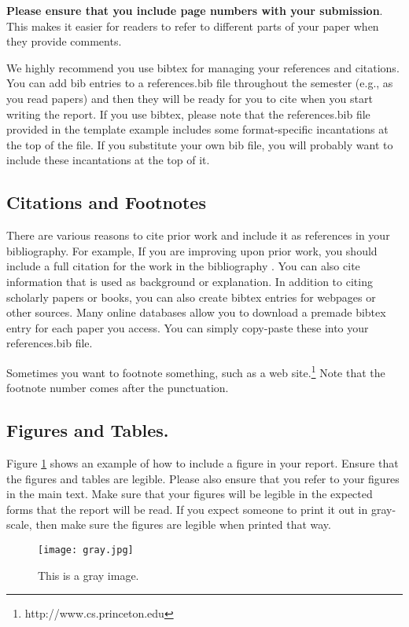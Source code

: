 \documentclass[pageno]{jpaper}
\begin{document}
\textbf{Please ensure that you include page numbers with your
submission}. This makes it easier for readers to refer to
different parts of your paper when they provide comments.

We highly recommend you use bibtex for managing your references and citations.  You can add bib entries to a references.bib file throughout the semester (e.g., as you read papers) and then they will be ready for you to cite when you start writing the report.  If you use bibtex, please note that the references.bib file provided in the template example includes some format-specific incantations at the top of the file.  If you substitute your own bib file, you will probably want to include these 
incantations at the top of it.

\subsection{Citations and Footnotes}

There are various reasons to cite prior work and include it as references in your bibliography.  For example, If you are improving upon 
prior work, you should include
a full citation for the work in the bibliography \cite{nicepaper,nicepaper2}. 
You can also cite information that is used as background or
explanation\cite{Salzberg:2005}.  In addition to citing scholarly papers or books, you can
also create bibtex entries for webpages or other sources.  Many online
databases allow you to download a premade bibtex entry for each paper
you access.  You can simply copy-paste these into your references.bib
file.

Sometimes you want to footnote something, such as a web
site.\footnote{http://www.cs.princeton.edu}  Note that the footnote
number comes after the punctuation.

\subsection{Figures and Tables.}

Figure \ref{fig:gray} shows an example of how to include a figure in
your report.  
Ensure that the figures and
tables are legible.  Please also ensure that you refer to your
figures in the main text. Make sure that your figures will be legible
in the expected forms that the report will be read.  If you expect someone
to print it out in gray-scale, then make sure the figures are legible 
when printed that way.  

\begin{figure}[hbt]
\centering
\texttt{[image: gray.jpg]}
\caption{This is a gray image.}
\label{fig:gray}
\end{figure}
\end{document}

